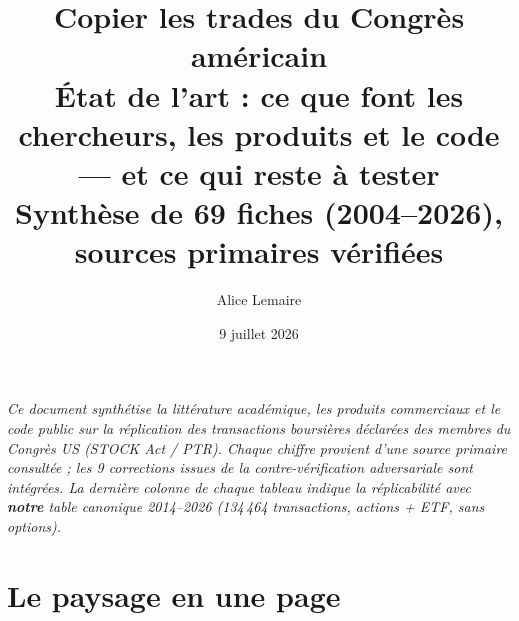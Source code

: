 \documentclass[11pt,a4paper]{article}
\title{\vspace{-1.6em}\textbf{\color{bleu}Copier les trades du Congrès américain}\\[3pt]
\large État de l'art : ce que font les chercheurs, les produits et le code --- et ce qui reste à tester\\[3pt]
\normalsize\color{gris} Synthèse de 69 fiches (2004--2026), sources primaires vérifiées}
\author{\small Alice Lemaire}
\date{\small 9 juillet 2026}
\begin{document}
\maketitle
\thispagestyle{fancy}
\vspace{-1.6em}

\begin{center}\small\itshape\color{gris}
Ce document synthétise la littérature académique, les produits commerciaux et le code public sur la
réplication des transactions boursières déclarées des membres du Congrès US (STOCK Act / PTR).
Chaque chiffre provient d'une source primaire consultée ; les 9 corrections issues de la contre-vérification
adversariale sont intégrées. La dernière colonne de chaque tableau indique la réplicabilité avec
\textbf{notre} table canonique 2014--2026 (134\,464 transactions, actions + ETF, sans options).
\end{center}

\section{Le paysage en une page}
\end{document}
